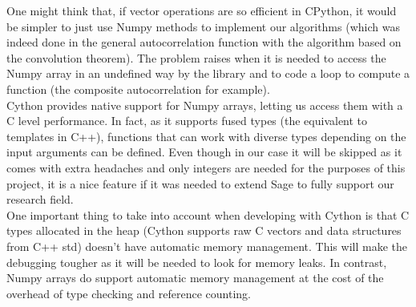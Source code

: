 
One might think that, if vector operations are so efficient in CPython, it would
be simpler to just use Numpy methods to implement our algorithms (which was
indeed done in the general autocorrelation function with the algorithm
based on the convolution theorem). The problem raises when it is needed to
access the Numpy array in an undefined way by the library and to code a loop to
compute a function (the composite autocorrelation for example).\\

Cython provides native support for Numpy arrays, letting us access them with a
C level performance. In fact, as it supports fused types (the equivalent to
templates in C++), functions that can work with diverse types
depending on the input arguments can be defined. Even though in our case it will
be skipped as it comes with extra headaches and only integers are needed for the
purposes of this project, it is a nice feature if it was needed to extend Sage to
fully support our research field.\\

One important thing to take into account when developing with Cython is that
C types allocated in the heap (Cython supports raw C vectors and data structures
from C++ std) doesn't have automatic memory management. This will make the
debugging tougher as it will be needed to look for memory leaks. In contrast,
Numpy arrays do support automatic memory management at the cost of the overhead
of type checking and reference counting.\\
